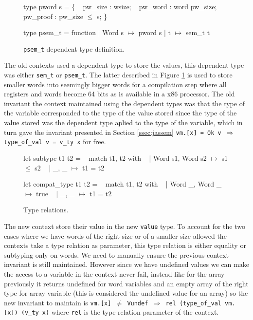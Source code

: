 \documentclass{article}
\begin{document}
\medskip

\begin{figure}
\obeylines\obeyspaces\ttfamily%
type pword s = \{
~ pw\_size  : wsize;
~ pw\_word  : word pw\_size;
~ pw\_proof : pw\_size \(\leq\) s;
\}

type psem\_t = function
| Word s \(\mapsto\) pword s
| t      \(\mapsto\) sem\_t t
\normalfont%
\caption{\texttt{psem\_t} dependent type definition.}\label{fig:psemt}
\end{figure}

The old contexts used a dependent type to store the values, this dependent type
was either \texttt{sem\_t} or \texttt{psem\_t}. The latter described in Figure
\ref{fig:psemt} is used to store smaller words into seemingly bigger words for
a compilation step where all registers and words become 64 bits as is available
in a x86 processor. The old invariant the context maintained using the dependent
types was that the type of the variable corresponded to the type of the value
stored since the type of the value stored was the dependent type aplied to the
type of the variable, which in turn gave the invariant presented in Section
\ref{ssec:jassem}
\texttt{vm.[x] = Ok v \(\Longrightarrow\) type\_of\_val v = v\_ty x} for free.

\begin{figure}[t]
\obeylines\obeyspaces\ttfamily%
let subtype t1 t2 =
~ match t1, t2 with
~ | Word s1, Word s2 \(\mapsto\) s1 \(\leq\) s2
~ | \_,       \_       \(\mapsto\) t1 = t2

let compat\_type t1 t2 =
~ match t1, t2 with
~ | Word \_, Word \_ \(\mapsto\) true
~ | \_,      \_      \(\mapsto\) t1 = t2
\normalfont%
\caption{Type relations.}
\end{figure}

The new context store their value in the new \texttt{value} type. To account for
the two cases where we have words of the right size or of a smaller size allowed
the contexts take a type relation as parameter, this type relation is either
equality or subtyping only on words. We need to manually ensure the previous
context invariant is still maintained. However since we have undefined values we
can make the access to a variable in the context never fail, instead like for
the array previously it returns undefined for word variables and an empty array
of the right type for array variable (this is considered the undefined value for
an array) so the new invariant to maintain is
\texttt{vm.[x] \(\neq\) Vundef \(\Longrightarrow\) rel (type\_of\_val vm.[x]) (v\_ty x)}
where \texttt{rel} is the type relation parameter of the context.
\end{document}
